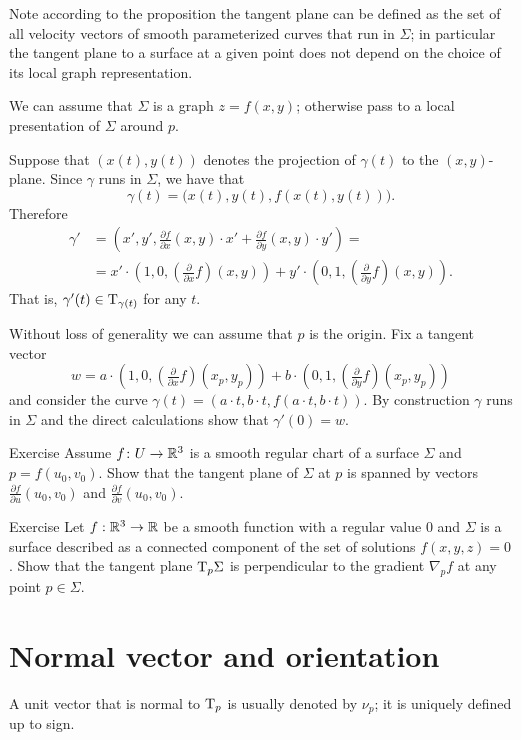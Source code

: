 Note according to the proposition the tangent plane can be defined as the set of all velocity vectors of smooth parameterized curves that run in $\Sigma$; in particular the tangent plane to a surface at a given point does not depend on the choice of its local graph representation.

We can assume that $\Sigma$ is a graph $z=f(x,y)$; 
otherwise pass to a local presentation of $\Sigma$ around $p$.

Suppose that $(x(t),y(t))$ denotes the projection of $\gamma(t)$ to the $(x,y)$-plane.
Since $\gamma$ runs in $\Sigma$, we have that
\[\gamma(t)=\bigl(x(t),y(t),f(x(t),y(t))\bigr).\]
Therefore 
\begin{align*}
\gamma'&=(x',y',\tfrac{\partial f}{\partial x}(x,y)\cdot x'+\tfrac{\partial f}{\partial y}(x,y)\cdot y')=
\\
&=x'\cdot (1,0,(\tfrac{\partial}{\partial x}f)(x,y))+y'\cdot (0,1,(\tfrac{\partial}{\partial y}f)(x,y)).
\end{align*}
That is, $\gamma'(t)\in\mathrm{T}_{\gamma(t)}$ for any $t$.

Without loss of generality we can assume that $p$ is the origin.
Fix a tangent vector 
\[w=a\cdot (1,0,(\tfrac{\partial}{\partial x}f)(x_p,y_p))+b\cdot(0,1,(\tfrac{\partial}{\partial y}f)(x_p,y_p))\] 
and consider the curve $\gamma(t)=(a\cdot t, b\cdot t, f(a\cdot t,b\cdot t))$.
By construction $\gamma$ runs in $\Sigma$ and the direct calculations show that $\gamma'(0)=w$.
\qeds

\begin{thm}{Exercise}\label{ex:tangent-chart}
Assume $f\colon U\to\mathbb{R}^3$ is a smooth regular chart of a surface $\Sigma$ and $p=f(u_0,v_0)$.
Show that the tangent plane of $\Sigma$ at $p$ is spanned by vectors $\tfrac{\partial f}{\partial u}(u_0,v_0)$ and $\tfrac{\partial f}{\partial v}(u_0,v_0)$.
\end{thm}

\begin{thm}{Exercise}\label{ex:tangent-normal}
Let $f:\mathbb{R}^3\to\mathbb{R}$ be a smooth function with a regular value $0$ and $\Sigma$ is a surface described as a connected component of the set of solutions $f(x,y,z)=0$.
Show that the tangent plane $\mathrm{T}_p\Sigma$ is perpendicular to the gradient $\nabla_pf$ at any point $p\in\Sigma$.
\end{thm}


\section*{Normal vector and orientation}
A unit vector that is normal to $\mathrm{T}_p$ is usually denoted by $\nu_p$;
it is uniquely defined up to sign.

